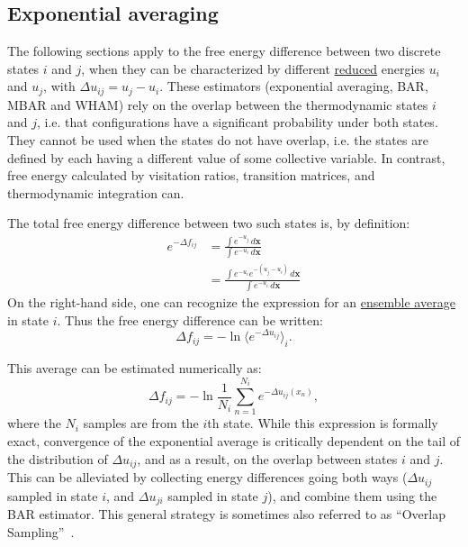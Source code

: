\documentclass[9pt,review]{livecoms}
\newcommand{\vx}{\mathbf{x}}
\begin{document}
\subsection{Exponential averaging}
\label{sec:fe_estimators:EXP}

The following sections apply to the free energy difference between two discrete states $i$ and $j$, when they can be characterized by different \hyperlink{ref:reduced} {reduced} energies $u_i$ and $u_j$, with $\Delta u_{ij} = u_j - u_i$.
These estimators (exponential averaging, BAR, MBAR and WHAM) rely on the overlap between the thermodynamic states $i$ and $j$, i.e. that configurations have a significant probability under both states. They cannot be used when the states do not have overlap, i.e. the states are defined by each having a different value of some collective variable.  In contrast, free energy calculated by visitation ratios, transition matrices, and thermodynamic integration can.

The total free energy difference between two such states is, by definition:
\begin{align}
    e^{-\Delta f_{ij}} &=  \frac{\int e^{-u_j} \, d\vx}{\int e^{-u_i} \, d\vx}\\
    &= \frac{\int e^{-u_i}  e^{-(u_j-u_i)} \, d\vx}{\int e^{-u_i} \, d\vx}
\end{align}
On the right-hand side, one can recognize the expression for an \hyperlink{ref:ensemble_average} {ensemble average} in state $i$.
Thus the free energy difference can be written:
\begin{equation}
    \Delta f_{ij} = -\ln \langle e^{-\Delta u_{ij}}\rangle_i.
\end{equation}

This average can be estimated numerically as:
\begin{equation}
\Delta f_{ij} = -\ln \frac{1}{N_i}\sum_{n=1}^{N_i} e^{-\Delta u_{ij}(x_n)},
\label{eq:expav}
\end{equation}
where the $N_i$ samples are from the $i$th state.
While this expression is formally exact, convergence of the exponential average is critically dependent on the tail of the distribution of $\Delta u_{ij}$, and as a result, on the overlap between states $i$ and $j$.
This can be alleviated by collecting energy differences going both ways ($\Delta u_{ij}$ sampled in state $i$, and $\Delta u_{ji}$ sampled in state $j$), and combine them using the BAR estimator.
This general strategy is sometimes also referred to as ``Overlap Sampling''~\cite{Lu2003}.
\end{document}
